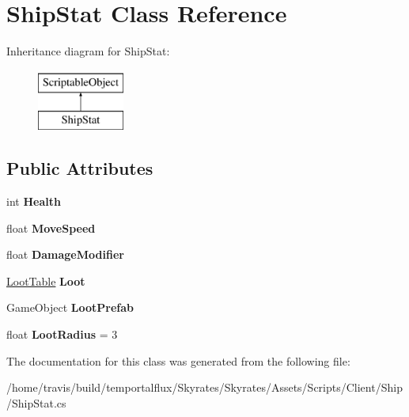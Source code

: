 \hypertarget{class_ship_stat}{\section{Ship\-Stat Class Reference}
\label{class_ship_stat}
}
Inheritance diagram for Ship\-Stat\-:\begin{figure}[H]
\begin{center}
\leavevmode
\includegraphics[height=2.000000cm]{class_ship_stat}
\end{center}
\end{figure}
\subsection*{Public Attributes}
\begin{DoxyCompactItemize}
\item 
\hypertarget{class_ship_stat_ab29fff973cecbe0c852a67b70a41bce7}{int {\bfseries Health}}\label{class_ship_stat_ab29fff973cecbe0c852a67b70a41bce7}

\item 
\hypertarget{class_ship_stat_a5eb3933b4e82d370adf8fe3b781b3f5e}{float {\bfseries Move\-Speed}}\label{class_ship_stat_a5eb3933b4e82d370adf8fe3b781b3f5e}

\item 
\hypertarget{class_ship_stat_af6fce7bb672881aa282ca755540f28d1}{float {\bfseries Damage\-Modifier}}\label{class_ship_stat_af6fce7bb672881aa282ca755540f28d1}

\item 
\hypertarget{class_ship_stat_a5c1c8d0ae16df851e395e157bb53d45a}{\hyperlink{class_skyrates_1_1_client_1_1_loot_1_1_loot_table}{Loot\-Table} {\bfseries Loot}}\label{class_ship_stat_a5c1c8d0ae16df851e395e157bb53d45a}

\item 
\hypertarget{class_ship_stat_a8061dc83b91d2113ddc1cc86c72a50cd}{Game\-Object {\bfseries Loot\-Prefab}}\label{class_ship_stat_a8061dc83b91d2113ddc1cc86c72a50cd}

\item 
\hypertarget{class_ship_stat_aa7529f6c48b591b4e61c46dfb18ed8e1}{float {\bfseries Loot\-Radius} = 3}\label{class_ship_stat_aa7529f6c48b591b4e61c46dfb18ed8e1}

\end{DoxyCompactItemize}


The documentation for this class was generated from the following file\-:\begin{DoxyCompactItemize}
\item 
/home/travis/build/temportalflux/\-Skyrates/\-Skyrates/\-Assets/\-Scripts/\-Client/\-Ship/Ship\-Stat.\-cs\end{DoxyCompactItemize}
